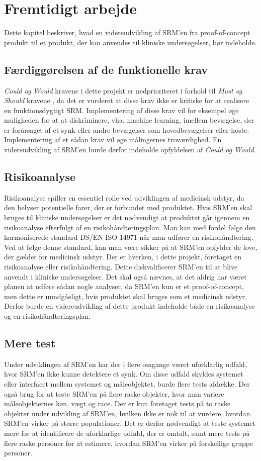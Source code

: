 \chapter{Fremtidigt arbejde}

Dette kapitel beskriver, hvad en videreudvikling af SRM'en fra proof-of-concept produkt til et produkt, der kan anvendes til kliniske undersøgelser, bør indeholde. 


\section{Færdiggørelsen af de funktionelle krav}
\textit{Could og Would} kravene i dette projekt er nedprioriteret i forhold til \textit{Must og Should} kravene , da det er vurderet at disse krav ikke er kritiske for at realisere en funktionsdygtigt SRM. Implementering af disse krav vil for eksempel øge muligheden for at at diskriminere, vha. machine learning, imellem bevægelse, der er forårsaget af et synk eller andre bevægelser som hovedbevægelser eller hoste. Implementering af et sådan krav vil øge målingernes troværdighed. En videreudvikling af SRM'en burde derfor indeholde opfyldelsen af \textit{Could og Would}.   
\section{Risikoanalyse}
 Risikoanalyse spiller en essentiel rolle ved udviklingen af medicinsk udstyr, da den belyser potentielle farer, der er forbundet med produktet. Hvis SRM'en skal bruges til kliniske undersøgelser er det nødvendigt at produktet går igennem en risikoanalyse efterfulgt af en risikohåndteringsplan. Man kan med fordel følge den harmoniserede standard DS/EN ISO 14971 når man udfører en risikohåndtering. Ved at følge denne standard, kan man være sikker på at SRM'en opfylder de love, der gælder for medicinsk udstyr. Der er hverken, i dette projekt, foretaget en risikoanalyse eller risikohåndtering. Dette diskvalificerer SRM'en til at blive anvendt i kliniske undersøgelser. Det skal også nævnes, at det aldrig har været planen at udføre sådan nogle analyser, da SRM'en kun er et proof-of-concept, men dette er uundgåeligt, hvis produktet skal bruges som et medicinsk udstyr. Derfor burde en videreudvikling af dette produkt indeholde både en risikoanalyse og en risikohåndteringsplan.     

\section{Mere test}
Under udviklingen af  SRM'en har der i flere omgange været uforklarlig udfald, hvor SRM'en ikke kunne detektere et synk. Om disse udfald skyldes systemet eller interfacet mellem systemet og måleobjektet, burde flere tests afdække. Der også brug for at teste SRM'en på flere raske objekter, hvor man variere måleobjekternes køn, vægt og race. Der er kun foretaget tests på to raske objekter under udvikling af SRM'en, hvilken ikke er nok til at vurdere, hvordan SRM'en virker på større populationer. Det er derfor nødvendigt at teste systemet mere for at identificere de uforklarlige udfald, der er omtalt, samt mere tests på flere raske personer for at estimere, hvordan SRM'en virker på forskellige gruppe personer.  
 
